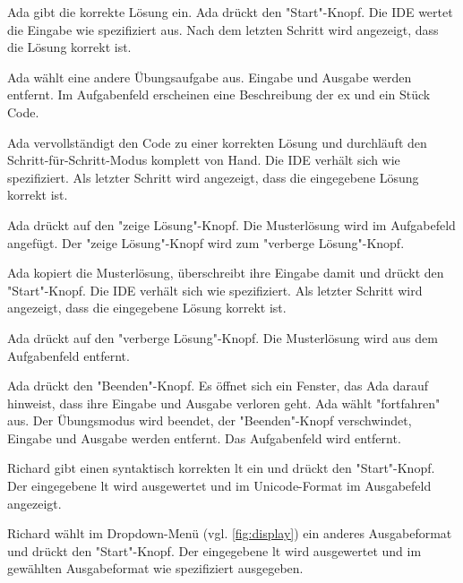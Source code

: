 \documentclass[parskip=full,11pt,twoside]{scrartcl}
\begin{document}
{Ada gibt die korrekte Lösung ein. Ada drückt den "Start"-Knopf.}
{Die IDE wertet die Eingabe wie spezifiziert aus.
 Nach dem letzten Schritt wird angezeigt, dass die Lösung korrekt ist.}
 
{Ada wählt eine andere Übungsaufgabe aus.}
{Eingabe und Ausgabe werden entfernt.
Im Aufgabenfeld erscheinen eine Beschreibung der \gls{ex} und ein Stück Code.}

{Ada vervollständigt den Code zu einer korrekten Lösung und durchläuft den Schritt-für-Schritt-Modus komplett von Hand.}
{Die IDE verhält sich wie spezifiziert.
 Als letzter Schritt wird angezeigt, dass die eingegebene Lösung korrekt ist.}

{Ada drückt auf den "zeige Lösung"-Knopf.}
{Die Musterlösung wird im Aufgabefeld angefügt.
 Der "zeige Lösung"-Knopf wird zum "verberge Lösung"-Knopf.}

{Ada kopiert die Musterlösung, überschreibt ihre Eingabe damit und drückt den "Start"-Knopf.}
{Die IDE verhält sich wie spezifiziert. 
 Als letzter Schritt wird angezeigt, dass die eingegebene Lösung korrekt ist.}
 
{Ada drückt auf den "verberge Lösung"-Knopf.}
{Die Musterlösung wird aus dem Aufgabenfeld entfernt.}
 
{Ada drückt den "Beenden"-Knopf.}
{Es öffnet sich ein Fenster, das Ada darauf hinweist, dass ihre Eingabe und Ausgabe verloren geht.
 Ada wählt "fortfahren" aus.
 Der Übungsmodus wird beendet, der "Beenden"-Knopf verschwindet, Eingabe und Ausgabe werden entfernt.
 Das Aufgabenfeld wird entfernt.}


{Richard gibt einen syntaktisch korrekten \gls{lt} ein und drückt den "Start"-Knopf.}
{Der eingegebene \gls{lt} wird ausgewertet und im Unicode-Format im Ausgabefeld angezeigt.}

{Richard wählt im Dropdown-Menü (vgl. \cref{fig:display}) ein anderes Ausgabeformat und drückt den "Start"-Knopf.}
{Der eingegebene \gls{lt} wird ausgewertet und im gewählten Ausgabeformat wie spezifiziert ausgegeben.}
\end{document}
